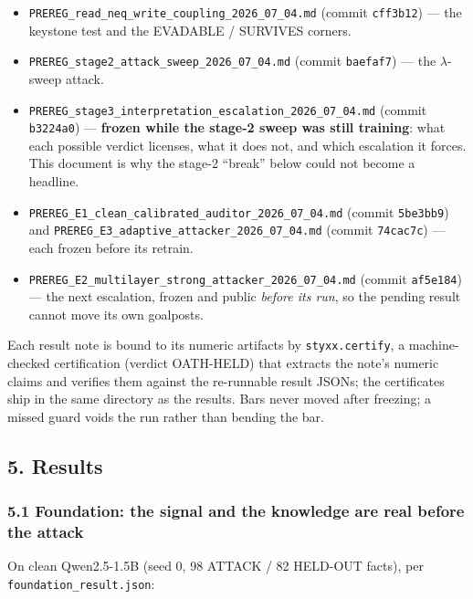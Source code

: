 \documentclass[
  11pt,
]{article}
\providecommand{\tightlist}{%
  \setlength{\itemsep}{0pt}\setlength{\parskip}{0pt}}
\begin{document}
\begin{itemize}
\tightlist
\item
  \texttt{PREREG\_read\_neq\_write\_coupling\_2026\_07\_04.md} (commit
  \texttt{cff3b12}) --- the keystone test and the EVADABLE / SURVIVES
  corners.
\item
  \texttt{PREREG\_stage2\_attack\_sweep\_2026\_07\_04.md} (commit
  \texttt{baefaf7}) --- the $\lambda$-sweep attack.
\item
  \texttt{PREREG\_stage3\_interpretation\_escalation\_2026\_07\_04.md}
  (commit \texttt{b3224a0}) --- \textbf{frozen while the stage-2 sweep
  was still training}: what each possible verdict licenses, what it does
  not, and which escalation it forces. This document is why the stage-2
  ``break'' below could not become a headline.
\item
  \texttt{PREREG\_E1\_clean\_calibrated\_auditor\_2026\_07\_04.md}
  (commit \texttt{5be3bb9}) and
  \texttt{PREREG\_E3\_adaptive\_attacker\_2026\_07\_04.md} (commit
  \texttt{74cac7c}) --- each frozen before its retrain.
\item
  \texttt{PREREG\_E2\_multilayer\_strong\_attacker\_2026\_07\_04.md}
  (commit \texttt{af5e184}) --- the next escalation, frozen and public
  \emph{before its run}, so the pending result cannot move its own
  goalposts.
\end{itemize}

Each result note is bound to its numeric artifacts by
\texttt{styxx.certify}, a machine-checked certification (verdict
OATH-HELD) that extracts the note's numeric claims and verifies them
against the re-runnable result JSONs; the certificates ship in the same
directory as the results. Bars never moved after freezing; a missed
guard voids the run rather than bending the bar.

\subsection{5. Results}\label{results}

\subsubsection{5.1 Foundation: the signal and the knowledge are real
before the
attack}\label{foundation-the-signal-and-the-knowledge-are-real-before-the-attack}

On clean Qwen2.5-1.5B (seed 0, 98 ATTACK / 82 HELD-OUT facts), per
\texttt{foundation\_result.json}:
\end{document}
